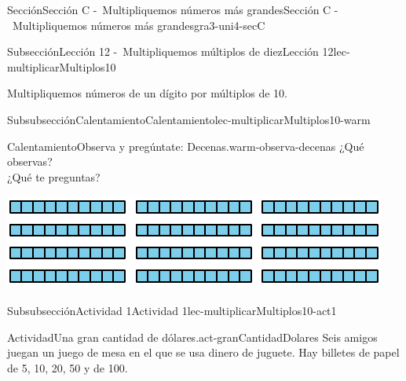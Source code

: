 \documentclass[twoside,10pt,]{article}
\begin{document}
\begin{sectionptx}{Sección}{Sección C -~Multipliquemos números más grandes}{}{Sección C -~Multipliquemos números más grandes}{}{}{gra3-uni4-secC}
%
%
\typeout{************************************************}
\typeout{************************************************}
%
\begin{subsectionptx}{Subsección}{Lección 12 -~Multipliquemos múltiplos de diez}{}{Lección 12}{}{}{lec-multiplicarMultiplos10}
\begin{introduction}{}%
Multipliquemos números de un dígito por múltiplos de 10.%
\end{introduction}%
%
%
\typeout{************************************************}
\typeout{************************************************}
%
\begin{subsubsectionptx}{Subsubsección}{Calentamiento}{}{Calentamiento}{}{}{lec-multiplicarMultiplos10-warm}
\begin{exploration}{Calentamiento}{Observa y pregúntate: Decenas.}{warm-observa-decenas}%
¿Qué observas?\\
 ¿Qué te preguntas?%
\begin{image}{0}{1}{0}{}%
\includegraphics[width=\linewidth]{external/svg-source/tikz-file-149355-scale13.pdf}
\end{image}%
\end{exploration}%
\end{subsubsectionptx}
%
%
\typeout{************************************************}
\typeout{************************************************}
%
\begin{subsubsectionptx}{Subsubsección}{Actividad 1}{}{Actividad 1}{}{}{lec-multiplicarMultiplos10-act1}
\begin{activity}{Actividad}{Una gran cantidad de dólares.}{act-granCantidadDolares}%
Seis amigos juegan un juego de mesa en el que se usa dinero de juguete. Hay billetes de papel de \textdollar{}5, \textdollar{}10, \textdollar{}20, \textdollar{}50 y de \textdollar{}100.%
%
\begin{enumerate}

\end{enumerate}
\end{activity}
\end{subsubsectionptx}
\end{subsectionptx}
\end{sectionptx}
\end{document}
